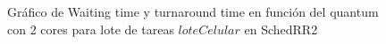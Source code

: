 \begin{figure}[H]
\hfill
{}
\hfill
{}
\hfill
\caption{Gráfico de Waiting time y turnaround time en función del quantum con 2 cores para lote de tareas $loteCelular$ en SchedRR2}
\end{figure}

